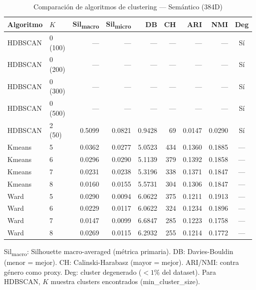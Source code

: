 \begin{table}[htbp]
  \centering
  \small
  \caption{Comparación de algoritmos de clustering --- Semántico (384D)}
  \label{tab:clustering_comparison_semantic_384d}
  \begin{tabular}{llrrrrrrc}
    \toprule
    Algoritmo & $K$ & Sil\textsubscript{macro} & Sil\textsubscript{micro} & DB & CH & ARI & NMI & Deg \\
    \midrule
    HDBSCAN & 0 (100) & --- & --- & --- & --- & --- & --- & Sí \\
    HDBSCAN & 0 (200) & --- & --- & --- & --- & --- & --- & Sí \\
    HDBSCAN & 0 (300) & --- & --- & --- & --- & --- & --- & Sí \\
    HDBSCAN & 0 (500) & --- & --- & --- & --- & --- & --- & Sí \\
    HDBSCAN & 2 (50) & 0.5099 & 0.0821 & 0.9428 & 69 & 0.0147 & 0.0290 & Sí \\
    Kmeans & 5 & 0.0362 & 0.0277 & 5.0523 & 434 & 0.1360 & 0.1885 & --- \\
    Kmeans & 6 & 0.0296 & 0.0290 & 5.1139 & 379 & 0.1392 & 0.1858 & --- \\
    Kmeans & 7 & 0.0231 & 0.0238 & 5.3196 & 338 & 0.1371 & 0.1847 & --- \\
    Kmeans & 8 & 0.0160 & 0.0155 & 5.5731 & 304 & 0.1306 & 0.1847 & --- \\
    Ward & 5 & 0.0290 & 0.0094 & 6.0622 & 375 & 0.1211 & 0.1913 & --- \\
    Ward & 6 & 0.0229 & 0.0117 & 6.0622 & 324 & 0.1234 & 0.1896 & --- \\
    Ward & 7 & 0.0147 & 0.0099 & 6.6847 & 285 & 0.1223 & 0.1758 & --- \\
    Ward & 8 & 0.0269 & 0.0115 & 6.2932 & 255 & 0.1214 & 0.1772 & --- \\
    \bottomrule
  \end{tabular}
  \begin{tablenotes}[flushleft]
    \small
    \item Sil\textsubscript{macro}: Silhouette macro-averaged (métrica primaria). DB: Davies-Bouldin (menor = mejor). CH: Calinski-Harabasz (mayor = mejor). ARI/NMI: contra género como proxy. Deg: cluster degenerado ($<1\%$ del dataset). Para HDBSCAN, $K$ muestra clusters encontrados (min\_cluster\_size).
  \end{tablenotes}
\end{table}